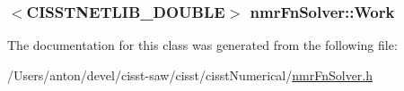 \subsubsection[{Work}]{$<$C\+I\+S\+S\+T\+N\+E\+T\+L\+I\+B\+\_\+\+D\+O\+U\+B\+L\+E$>$ nmr\+Fn\+Solver\+::\+Work\hspace{0.3cm}{\ttfamily [protected]}}\label{classnmr_fn_solver_ac641a0ef17a172725774a7b5703f95aa}


The documentation for this class was generated from the following file\+:\begin{DoxyCompactItemize}
\item 
/\+Users/anton/devel/cisst-\/saw/cisst/cisst\+Numerical/\hyperlink{nmr_fn_solver_8h}{nmr\+Fn\+Solver.\+h}\end{DoxyCompactItemize}
